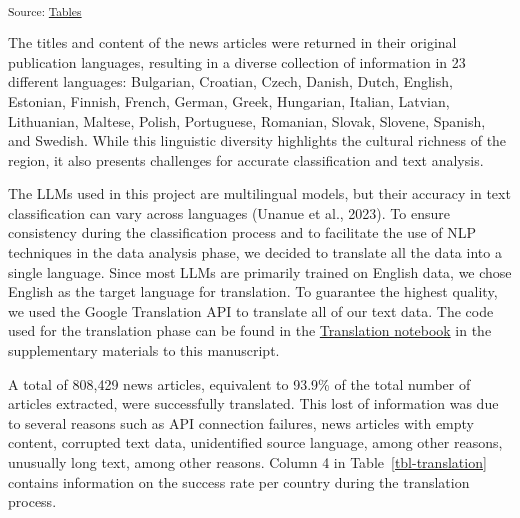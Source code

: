 \documentclass[
]{agujournal2019}
\begin{document}
\textsubscript{Source:
\href{https://ctoruno.github.io/eu-rol-tracker/notebooks/tables-preview.html\#cell-tbl-extraction}{Tables}}

The titles and content of the news articles were returned in their
original publication languages, resulting in a diverse collection of
information in 23 different languages: Bulgarian, Croatian, Czech,
Danish, Dutch, English, Estonian, Finnish, French, German, Greek,
Hungarian, Italian, Latvian, Lithuanian, Maltese, Polish, Portuguese,
Romanian, Slovak, Slovene, Spanish, and Swedish. While this linguistic
diversity highlights the cultural richness of the region, it also
presents challenges for accurate classification and text analysis.

The LLMs used in this project are multilingual models, but their
accuracy in text classification can vary across languages (Unanue et
al., 2023). To ensure consistency during the classification process and
to facilitate the use of NLP techniques in the data analysis phase, we
decided to translate all the data into a single language. Since most
LLMs are primarily trained on English data, we chose English as the
target language for translation. To guarantee the highest quality, we
used the Google Translation API to translate all of our text data. The
code used for the translation phase can be found in the
\href{https://ctoruno.github.io/eu-rol-tracker/notebooks/1_EU_news_translation_1-preview.html}{Translation
notebook} in the supplementary materials to this manuscript.

A total of 808,429 news articles, equivalent to 93.9\% of the total
number of articles extracted, were successfully translated. This lost of
information was due to several reasons such as API connection failures,
news articles with empty content, corrupted text data, unidentified
source language, among other reasons, unusually long text, among other
reasons. Column 4 in Table~\ref{tbl-translation} contains information on
the success rate per country during the translation process.
\end{document}
